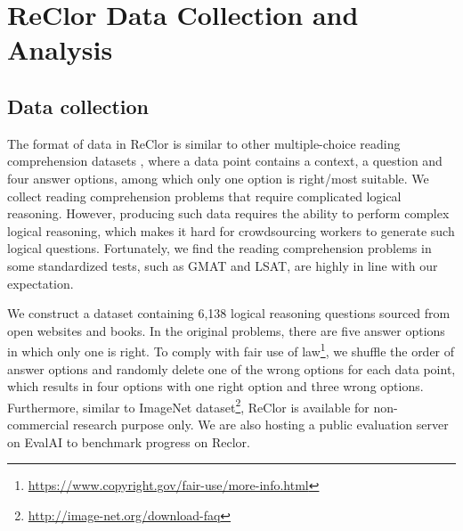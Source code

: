 \documentclass{article} \usepackage{iclr2020_conference,times}
\begin{document}
\section{ReClor Data Collection and Analysis}
\vspace{-2mm}
\subsection{Data collection}
The format of data in ReClor is similar to other multiple-choice reading comprehension datasets \citep{richardson2013mctest, lai2017race}, where a data point contains a context, a question and four answer options, among which only one option is right/most suitable. We collect reading comprehension problems that require complicated logical reasoning. However, producing such data requires the ability to perform complex logical reasoning, which makes it hard for crowdsourcing workers to generate such logical questions. Fortunately, we find the reading comprehension problems in some standardized tests, such as GMAT and LSAT, are highly in line with our expectation. 
	

We construct a dataset containing 6,138 logical reasoning questions sourced from open websites and books. In the original problems, there are five answer options in which only one is right. To comply with fair use of law\footnote{\url{https://www.copyright.gov/fair-use/more-info.html}}, we shuffle the order of answer options and randomly delete one of the wrong options for each data point, which results in four options with one right option and three wrong options. Furthermore, similar to ImageNet dataset\footnote{\url{http://image-net.org/download-faq}}, ReClor is available for non-commercial research purpose only. We are also hosting a public evaluation server on EvalAI \citep{EvalAI} to benchmark progress on Reclor.
\end{document}
